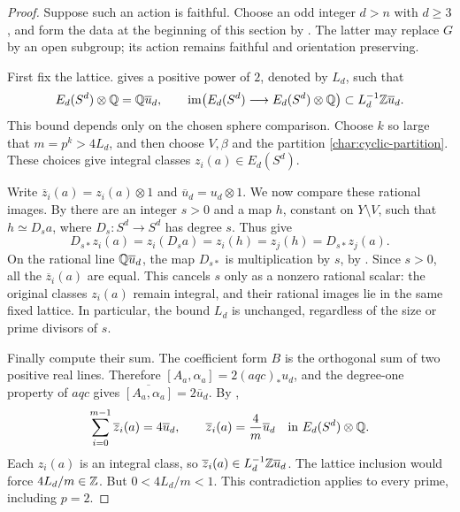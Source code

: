\begin{proof}
Suppose such an action is faithful.  Choose an odd integer $d>n$ with
$d\geq3$, and form the data at the beginning of this section by
.  The latter may replace $G$ by
an open subgroup; its action remains faithful and orientation preserving.

First fix the lattice.   gives a positive
power of $2$, denoted by $L_d$, such that
\[
 E_d(S^d)\otimes\mathbb Q=\mathbb Q\overline{u}_d,\qquad
 \operatorname{im}\bigl(E_d(S^d)\longrightarrow E_d(S^d)\otimes\mathbb Q\bigr)
       \subset L_d^{-1}\mathbb Z\overline{u}_d.
\]
This bound depends only on the chosen sphere comparison.  Choose $k$
so large that $m=p^k>4L_d$, and then choose $V,\beta$ and the partition
\eqref{char:cyclic-partition}.  These choices give integral classes
$z_i(a)\in E_d(S^d)$.

Write $\overline{z}_i(a)=z_i(a)\otimes1$ and
$\overline{u}_d=u_d\otimes1$.  We now compare these rational images. By  there
are an integer $s>0$ and a map $h$,
constant on $Y\setminus V$, such that $h\simeq D_s a$, where
$D_s:S^d\to S^d$ has degree $s$.  Thus
 give
\[
 D_{s*}z_i(a)=z_i(D_s a)=z_i(h)=z_j(h)=D_{s*}z_j(a).
\]
On the rational line $\mathbb Q\overline{u}_d$, the map $D_{s*}$ is multiplication by
$s$, by .  Since $s>0$, all the $\overline{z}_i(a)$
are equal.  This cancels $s$ only as a nonzero
rational scalar: the original classes $z_i(a)$ remain integral, and
their rational images lie in the same fixed lattice.  In particular,
the bound $L_d$ is unchanged,
regardless of the size or prime divisors of $s$.

Finally compute their sum.  The coefficient form $B$ is the orthogonal
sum of two positive real lines.  Therefore
$[A_a,\alpha_a]=2(aqc)_*u_d$, and the degree-one property of $aqc$
gives $\overline{[A_a,\alpha_a]}=2\overline{u}_d$.  By
,
\[
 \sum_{i=0}^{m-1}\overline{z}_i(a)=4\overline{u}_d,
 \qquad \overline{z}_i(a)=\frac4m\overline{u}_d
       \quad\text{in }E_d(S^d)\otimes\mathbb Q.
\]
Each $z_i(a)$ is an integral class, so
$\overline{z}_i(a)\in L_d^{-1}\mathbb Z\overline{u}_d$. The lattice inclusion
would force $4L_d/m\in\mathbb Z$.  But $0<4L_d/m<1$.  This contradiction applies
to every prime, including $p=2$.
\end{proof}

